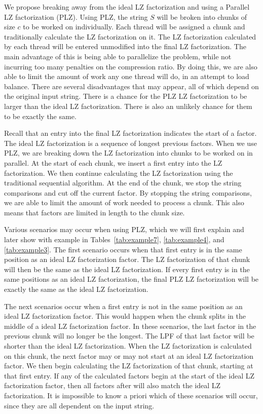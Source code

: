 We propose breaking away from the ideal LZ factorization and using a Parallel LZ factorization (PLZ).
Using PLZ, the string $S$ will be broken into chunks of size $c$ to be worked on individually.
Each thread will be assigned a chunk and traditionally calculate the LZ factorization on it.
The LZ factorization calculated by each thread will be entered unmodified into the final LZ factorization.
The main advantage of this is being able to parallelize the problem, while not incurring too many penalties on the compression ratio.
By doing this, we are also able to limit the amount of work any one thread will do, in an attempt to load balance.
There are several disadvantages that may appear, all of which depend on the original input string.
There is a chance for the PLZ LZ factorization to be larger than the ideal LZ factorization.
There is also an unlikely chance for them to be exactly the same.

Recall that an entry into the final LZ factorization indicates the start of a factor.
The ideal LZ factorization is a sequence of longest previous factors.
When we use PLZ, we are breaking down the LZ factorization into chunks to be worked on in parallel.
At the start of each chunk, we insert a first entry into the LZ factorization.
We then continue calculating the LZ factorization using the traditional sequential algorithm.
At the end of the chunk, we stop the string comparisons and cut off the current factor.
By stopping the string comparisons, we are able to limit the amount of work needed to process a chunk.
This also means that factors are limited in length to the chunk size.

Various scenarios may occur when using PLZ, which we will first explain and later show with example in Tables~\ref{tab:example7}, \ref{tab:example4}, and \ref{tab:example3}. 
The first scenario occurs when that first entry is in the same position as an ideal LZ factorization factor.
The LZ factorization of that chunk will then be the same as the ideal LZ factorization.
If every first entry is in the same positions as an ideal LZ factorization, the final PLZ LZ factorization will be exactly the same as the ideal LZ factorization.

The next scenarios occur when a first entry is not in the same position as an ideal LZ factorization factor.
This would happen when the chunk splits in the middle of a ideal LZ factorization factor.
In these scenarios, the last factor in the previous chunk will no longer be the longest.
The LPF of that last factor will be shorter than the ideal LZ factorization.
When the LZ factorization is calculated on this chunk, the next factor may or may not start at an ideal LZ factorization factor.
We then begin calculating the LZ factorization of that chunk, starting at that first entry.
If any of the calculated factors begin at the start of the ideal LZ factorization factor, then all factors after will also match the ideal LZ factorization.
It is impossible to know a priori which of these scenarios will occur, since they are all dependent on the input string.

